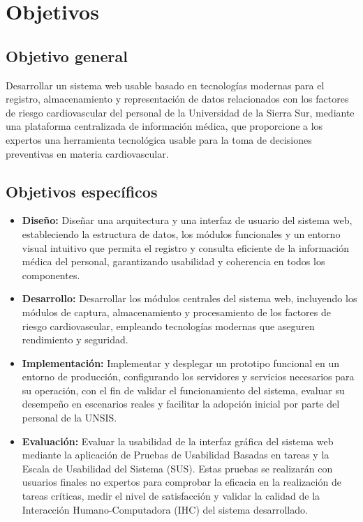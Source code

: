 \section{Objetivos}

    \subsection{Objetivo general}
        Desarrollar un sistema web usable basado en tecnologías modernas para el registro, almacenamiento y representación de datos relacionados con los factores de riesgo cardiovascular del personal de la Universidad de la Sierra Sur, mediante una plataforma centralizada de información médica, que proporcione a los expertos una herramienta tecnológica usable para la toma de decisiones preventivas en materia cardiovascular.
        
    \subsection{Objetivos específicos}
    
        \begin{itemize}
            \item \textbf{Diseño:} Diseñar una arquitectura y una interfaz de usuario del sistema web, estableciendo la estructura de datos, los módulos funcionales y un entorno visual intuitivo que permita el registro y consulta eficiente de la información médica del personal, garantizando usabilidad y coherencia en todos los componentes.
        
            \item \textbf{Desarrollo:} Desarrollar los módulos centrales del sistema web, incluyendo los módulos de captura, almacenamiento y procesamiento de los factores de riesgo cardiovascular, empleando tecnologías modernas que aseguren rendimiento y seguridad.
        
            \item \textbf{Implementación:} Implementar y desplegar un prototipo funcional en un entorno de producción, configurando los servidores y servicios necesarios para su operación, con el fin de validar el funcionamiento del sistema, evaluar su desempeño en escenarios reales y facilitar la adopción inicial por parte del personal de la UNSIS.

            \item \textbf{Evaluación:} Evaluar la usabilidad de la interfaz gráfica del sistema web mediante la aplicación de Pruebas de Usabilidad Basadas en tareas y la Escala de Usabilidad del Sistema (SUS). Estas pruebas se realizarán con usuarios finales no expertos para comprobar la eficacia en la realización de tareas críticas, medir el nivel de satisfacción y validar la calidad de la Interacción Humano-Computadora (IHC) del sistema desarrollado.
        \end{itemize}

